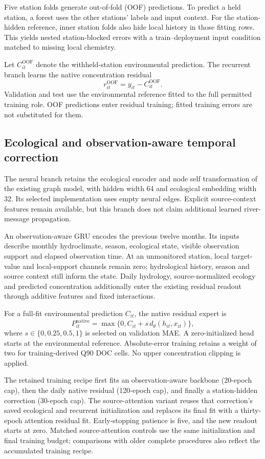 \documentclass[11pt]{article}
\begin{document}
Five station folds generate out-of-fold (OOF) predictions. To predict a held station, a forest uses the other stations' labels and input context. For the station-hidden reference, inner station folds also hide local history in those fitting rows. This yields nested station-blocked errors with a train--deployment input condition matched to missing local chemistry.

Let $C^{\mathrm{OOF}}_{it}$ denote the withheld-station environmental prediction. The recurrent branch learns the native concentration residual
\[
 r^{\mathrm{OOF}}_{it}=y_{it}-C^{\mathrm{OOF}}_{it}.
\]
Validation and test use the environmental reference fitted to the full permitted training role. OOF predictions enter residual training; fitted training errors are not substituted for them.

\subsection{Ecological and observation-aware temporal correction}
The neural branch retains the ecological encoder and node self transformation of the existing graph model, with hidden width 64 and ecological embedding width 32. Its selected implementation uses empty neural edges. Explicit source-context features remain available, but this branch does not claim additional learned river-message propagation.

An observation-aware GRU encodes the previous twelve months. Its inputs describe monthly hydroclimate, season, ecological state, visible observation support and elapsed observation time. At an unmonitored station, local target-value and local-support channels remain zero; hydrological history, season and source context still inform the state. Daily hydrology, source-normalized ecology and predicted concentration additionally enter the existing residual readout through additive features and fixed interactions.

For a full-fit environmental prediction $C_{it}$, the native residual expert is
\[
 P^{\mathrm{native}}_{it}=\max\{0,C_{it}+s\,d_\theta(h_{it},x_{it})\},
\]
where $s\in\{0, 0.25, 0.5, 1\}$ is selected on validation MAE. A zero-initialized head starts at the environmental reference. Absolute-error training retains a weight of two for training-derived Q90 DOC cells. No upper concentration clipping is applied.

The retained training recipe first fits an observation-aware backbone (20-epoch cap), then the daily native residual (120-epoch cap), and finally a station-hidden correction (30-epoch cap). The source-attention variant reuses that correction's saved ecological and recurrent initialization and replaces its final fit with a thirty-epoch attention residual fit. Early-stopping patience is five, and the new readout starts at zero. Matched source-attention controls use the same initialization and final training budget; comparisons with older complete procedures also reflect the accumulated training recipe.
\end{document}
